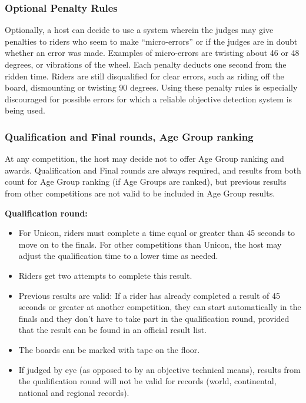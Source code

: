 \subsubsection{Optional Penalty Rules}
Optionally, a host can decide to use a system wherein the judges may give penalties to riders who seem to make ``micro-errors'' or if the judges are in doubt whether an error was made.
Examples of micro-errors are twisting about 46 or 48 degrees, or vibrations of the wheel.
Each penalty deducts one second from the ridden time.
Riders are still disqualified for clear errors, such as riding off the board, dismounting or twisting 90 degrees.
Using these penalty rules is especially discouraged for possible errors for which a reliable objective detection system is being used.

\subsubsection{Qualification and Final rounds, Age Group ranking}
At any competition, the host may decide not to offer Age Group ranking and awards.
Qualification and Final rounds are always required, and results from both count for Age Group ranking (if Age Groups are ranked), but previous results from other competitions are not valid to be included in Age Group results.

\textbf{Qualification round:}
\begin{itemize}
\item For Unicon, riders must complete a time equal or greater than 45 seconds to move on to the finals.
  For other competitions than Unicon, the host may adjust the qualification time to a lower time as needed.
\item Riders get two attempts to complete this result.
\item Previous results are valid: If a rider has already completed a result of 45 seconds or greater at another competition, they can start automatically in the finals and they don't have to take part in the qualification round, provided that the result can be found in an official result list.
\item The boards can be marked with tape on the floor.
\item If judged by eye (as opposed to by an objective technical means), results from the qualification round will not be valid for records (world, continental, national and regional records).
\end{itemize}

